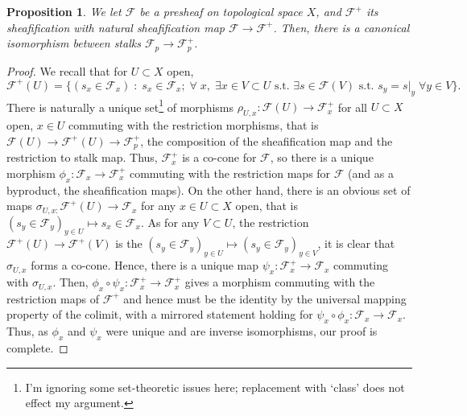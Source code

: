 \documentclass[english]{article}
\newcommand{\evat}[3]{\left. #1\right|_{#2}^{#3}}
\newcommand{\FF}{\mathscr{F}}
\newcommand{\prob}[1]{\setcounter{section}{#1-1}\section{}}
\newtheorem*{proposition*}{Proposition}
\theoremstyle{remark}
\theoremstyle{definition}
\newcommand{\restr}[2]{\evat{#1}{#2}{}}
\begin{document}
\prob{7}\begin{proposition*}
	We let $\FF$ be a presheaf on topological space $X$, and $\FF^+$ its sheafification with natural sheafification map $\FF\to \FF^+$. Then, there is a canonical isomorphism between stalks $\FF_p\to \FF^+_p$.
\end{proposition*}
\begin{proof}
	We recall that for $U\subset X$ open, $$\FF^+(U)=\{(s_x\in \FF_x)\;:\; s_x\in \FF_x;\;\forall \;x,\;\exists x\in V\subset U \text{ s.t. } \exists s\in \FF(V)\text{ s.t. } s_y=\restr{s}{y}\;\forall y\in V\}.$$ There is naturally a unique set\footnote{I'm ignoring some set-theoretic issues here; replacement with `class' does not effect my argument.} of morphisms $\rho_{U,x}:\FF(U)\to \FF^+_x$ for all $U\subset X$ open, $x\in U$ commuting with the restriction morphisms, that is $\FF(U)\to\FF^+(U)\to \FF^+_p$, the composition of the sheafification map and the restriction to stalk map. Thus, $\FF^+_x$ is a co-cone for $\FF$, so there is a unique morphism $\phi_x:\FF_x\to \FF^+_x$ commuting with the restriction maps for $\FF$ (and as a byproduct, the sheafification maps). On the other hand, there is an obvious set of maps $\sigma_{U,x:}\FF^+(U)\to \FF_x$ for any $x\in U\subset X$ open, that is $(s_y\in \FF_y)_{y\in U}\mapsto s_x\in \FF_x$. As for any $V\subset U$, the restriction $\FF^+(U)\to \FF^+(V)$ is the  $(s_y\in \FF_y)_{y\in U}\mapsto (s_y\in \FF_y)_{y\in V}$, it is clear that $\sigma_{U,x}$ forms a co-cone. Hence, there is a unique map $\psi_x:\FF^+_x\to \FF_x$ commuting with $\sigma_{U,x}$. Then, $\phi_x\circ \psi_x:\FF_x^+\to \FF_x^+$ gives a morphism commuting with the restriction maps of $\FF^+$ and hence must be the identity by the universal mapping property of the colimit, with a mirrored statement holding for $\psi_x\circ \phi_x:\FF_x\to \FF_x$. Thus, as $\phi_x$ and $\psi_x$ were unique and are inverse isomorphisms, our proof is complete.
\end{proof}
\end{document}
